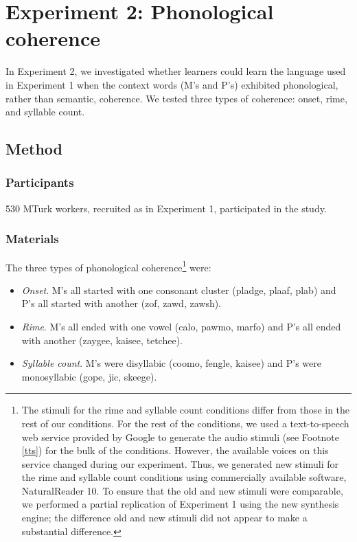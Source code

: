 \documentclass[man,floatsintext]{apa6}
\begin{document}
\section{Experiment 2: Phonological coherence}

In Experiment 2, we investigated whether learners could learn the language used in  Experiment 1 when the context words (M's and P's) exhibited phonological, rather than semantic, coherence. We tested three types of coherence: onset, rime, and syllable count.

\subsection{Method}
\subsubsection{Participants} 
530 MTurk workers, recruited as in Experiment 1, participated in the study.

\subsubsection{Materials}
The three types of phonological coherence\footnote{\label{change-of-stimuli} The stimuli for the rime and syllable count conditions differ from those in the rest of our conditions. For the rest of the conditions, we used a text-to-speech web service provided by Google to generate the audio stimuli (see Footnote \ref{tts}) for the bulk of the conditions. However, the available voices on this service changed during our experiment. Thus, we generated new stimuli for the rime and syllable count conditions using commercially available software, NaturalReader 10. To ensure that the old and new stimuli were comparable, we performed a partial replication of Experiment 1 using the new synthesis engine; the difference old and new stimuli did not appear to make a substantial difference.} were:

\begin{itemize}
\item \emph{Onset}. M's all started with one consonant cluster (pladge, plaaf, plab) and P's all started with another (zof, zawd, zawsh).
\item \emph{Rime}. M's all ended with one vowel (calo, pawmo, marfo) and P's all ended with another (zaygee, kaisee, tetchee).
\item \emph{Syllable count}. M's were disyllabic (coomo, fengle, kaisee) and P's were monosyllabic (gope, jic, skeege).
\end{itemize}
\end{document}

